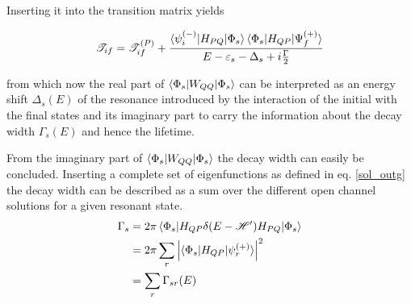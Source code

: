 Inserting it into the transition matrix yields

\begin{equation}
  \mathscr{T}_{if} = \mathscr{T}_{if}^{(P)} + 
                     \frac{\braket{\psi_i^{(-)}|H_{PQ}|\Phi_s}
                           \braket{\Phi_s|H_{QP}|\Psi_f^{(+)}}}
                          {E-\varepsilon_s - \Delta_s + i \frac{\Gamma}{2}}
\end{equation}

from which now the real part of $\braket{\Phi_s|W_{QQ}|\Phi_s}$ can be interpreted 
as an energy shift $\Delta_s(E)$ of the resonance introduced by the interaction of the initial
with the final states and its imaginary part to carry the information about the
decay width $\Gamma_s(E)$ and hence the lifetime.






From the imaginary part of $\braket{\Phi_s|W_{QQ}|\Phi_s}$ the decay width can easily be concluded. Inserting a complete set
of eigenfunctions as defined in eq. \ref{sol_outg} the decay width can be described
as a sum over the different open channel solutions for a given resonant state.
\begin{align}
  \Gamma_s & = 2 \pi \braket{\Phi_s|H_{QP}\delta(E-\mathscr{H}')H_{PQ}|\Phi_s}\\
           & = 2 \pi \sum\limits_r \left | \braket{\Phi_s|H_{QP}|\psi_r^{(+)}} \right|^2\\
           & = \sum\limits_r \Gamma_{sr}(E)
\end{align}
